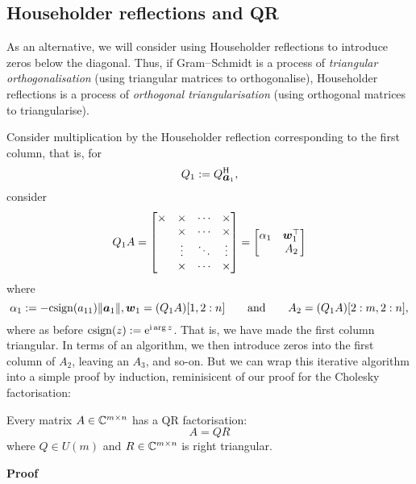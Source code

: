 \subsection{Householder reflections and QR}
As an alternative, we will consider using Householder reflections to introduce zeros below the diagonal. Thus, if Gram\ensuremath{\endash}Schmidt is a process of \emph{triangular orthogonalisation} (using triangular matrices to orthogonalise), Householder reflections is a process of \emph{orthogonal triangularisation}  (using orthogonal matrices to triangularise).

Consider multiplication by the Householder reflection corresponding to the first column, that is, for
\[
Q_1 := Q_{\bm{{\mbox{\boldmath$a$\unboldmath}}}_1}^{\rm H},
\]
consider
\[
Q_1 A = \begin{bmatrix} \ensuremath{\times} & \ensuremath{\times} & \ensuremath{\cdots} & \ensuremath{\times} \\
& \ensuremath{\times} & \ensuremath{\cdots} & \ensuremath{\times} \\
                    & \ensuremath{\vdots} & \ensuremath{\ddots} & \ensuremath{\vdots} \\
                    & \ensuremath{\times} & \ensuremath{\cdots} & \ensuremath{\times} \end{bmatrix} = 
\begin{bmatrix}  \ensuremath{\alpha}_1 & \ensuremath{\bm{\w}}_1^\ensuremath{\top} \\ 
& A_2   \end{bmatrix}
\]
where 
\[
\alpha_1 := -{\rm csign}(a_{11})  \|\bm{{\mbox{\boldmath$a$\unboldmath}}}_1\|, \bm{{\mbox{\boldmath$w$\unboldmath}}}_1 = (Q_1 A)[1, 2:n]  \qquad \hbox{and} \qquad A_2 = (Q_1 A)[2:m, 2:n],
\]
where as before ${\rm csign}(z) :=  {\rm e}^{{\rm i} \arg z}$. That is, we have made the first column triangular. In terms of an algorithm, we then introduce zeros into the first column of $A_2$, leaving an $A_3$, and so-on. But we can wrap this iterative algorithm into a simple proof by induction, reminisicent of our proof for the Cholesky factorisation:

\begin{theorem}[QR]  Every matrix $A \in {\mathbb C}^{m \times n}$ has a QR factorisation:
\[
A = QR
\]
where $Q \ensuremath{\in} U(m)$ and $R \in {\mathbb C}^{m \times n}$ is right triangular.

\end{theorem}
\textbf{Proof}

